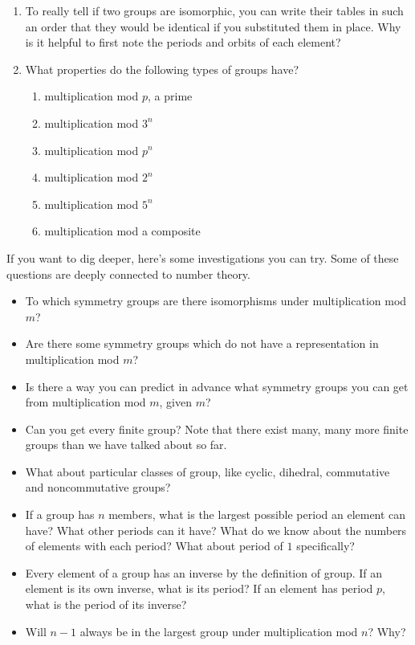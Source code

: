 \documentclass[../gatm.tex]{subfiles}
\begin{document}
\begin{enumerate}
\item To really tell if two groups are isomorphic, you can write their tables in such an order that they would be identical if you substituted them in place. Why is it helpful to first note the periods and orbits of each element?
\item What properties do the following types of groups have?
\begin{multicols}{2}
\begin{enumerate}
\item multiplication mod $p$, a prime
\item multiplication mod $3^n$
\item multiplication mod $p^n$
\item multiplication mod $2^n$
\item multiplication mod $5^n$
\item multiplication mod a composite
\end{enumerate}
\end{multicols}
\setcounter{problem_i}{\value{enumi}}
\end{enumerate}

\noindent If you want to dig deeper, here's some investigations you can try. Some of these questions are deeply connected to number theory.
\begin{itemize}
\item To which symmetry groups are there isomorphisms under multiplication mod $m$?
\item Are there some symmetry groups which do not have a representation in multiplication mod $m$?
\item Is there a way you can predict in advance what symmetry groups you can get from multiplication mod $m$, given $m$?
\item Can you get every finite group? Note that there exist many, many more finite groups than we have talked about so far.
\item What about particular classes of group, like cyclic, dihedral, commutative and noncommutative groups?
\item If a group has $n$ members, what is the largest possible period an element can have? What other periods can it have? What do we know about the numbers of elements with each period? What about period of $1$ specifically?
\item Every element of a group has an inverse by the definition of group. If an element is its own inverse, what is its period? If an element has period $p$, what is the period of its inverse?
\item Will $n-1$ always be in the largest group under multiplication mod $n$? Why?
\end{itemize}
\end{document}
